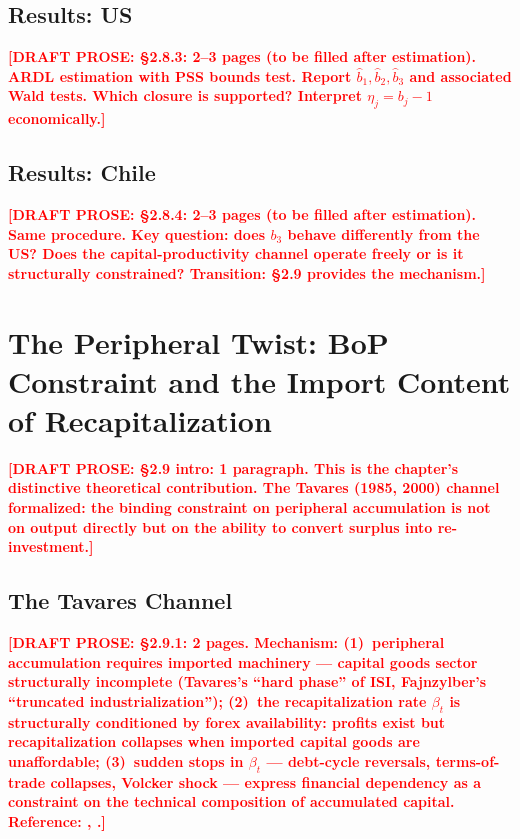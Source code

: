 \documentclass[12pt,letterpaper]{article}
\newcommand{\betat}{\beta_t}       %
\newcommand{\draftnote}[1]{%
  \textcolor{red}{\textbf{[DRAFT PROSE: #1]}}}
\begin{document}
\subsection{Results: US}
\label{sec:stageB_us}

\draftnote{§2.8.3: 2--3 pages (to be filled after estimation).
  ARDL estimation with PSS bounds test. Report $\hat{b}_1, \hat{b}_2, \hat{b}_3$
  and associated Wald tests. Which closure is supported?
  Interpret $\eta_j = b_j - 1$ economically.}


\subsection{Results: Chile}
\label{sec:stageB_chile}

\draftnote{§2.8.4: 2--3 pages (to be filled after estimation).
  Same procedure. Key question: does $b_3$ behave differently from the US?
  Does the capital-productivity channel operate freely or is it structurally
  constrained? Transition: §2.9 provides the mechanism.}


\section{The Peripheral Twist: BoP Constraint and the Import
  Content of Recapitalization}
\label{sec:tavares}

\draftnote{§2.9 intro: 1 paragraph. This is the chapter's distinctive
  theoretical contribution. The Tavares (1985, 2000) channel formalized:
  the binding constraint on peripheral accumulation is not on output
  directly but on the ability to convert surplus into re-investment.}


\subsection{The Tavares Channel}
\label{sec:tavares_channel}

\draftnote{§2.9.1: 2 pages. Mechanism:
  (1)~peripheral accumulation requires imported machinery — capital goods sector
  structurally incomplete (Tavares's ``hard phase'' of ISI,
  Fajnzylber's ``truncated industrialization'');
  (2)~the recapitalization rate $\betat$ is structurally conditioned by
  forex availability: profits exist but recapitalization collapses when
  imported capital goods are unaffordable;
  (3)~sudden stops in $\betat$ — debt-cycle reversals, terms-of-trade
  collapses, Volcker shock — express financial dependency as a constraint
  on the technical composition of accumulated capital.
  Reference: \citet{tavares1985}, \citet{vernengo2006}.}
\end{document}
